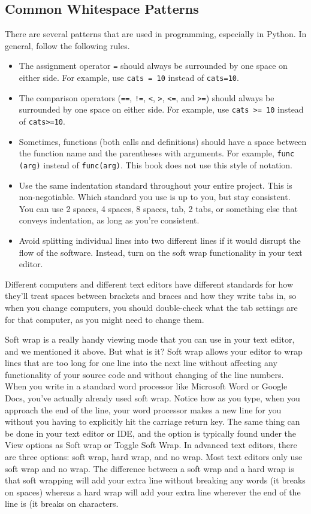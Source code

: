 \subsection{Common Whitespace Patterns}
There are several  patterns that are used in programming, especially in Python. In general, follow the following rules.\par
\begin{itemize}
    \item The assignment operator \verb|=| should always be surrounded by one space on either side. For example, use \verb|cats = 10| instead of \verb|cats=10|.
    \item The comparison operators (\verb|==|, \verb|!=|, \verb|<|, \verb|>|, \verb|<=|, and \verb|>=|) should always be surrounded by one space on either side. For example, use \verb|cats >= 10| instead of \verb|cats>=10|.
    \item Sometimes, functions (both calls and definitions) should have a space between the function name and the parentheses with arguments. For example, \verb|func (arg)| instead of \verb|func(arg)|. This book does not use this style of notation.
    \item Use the same indentation standard throughout your entire project. This is non-negotiable. Which standard you use is up to you, but stay consistent. You can use 2 spaces, 4 spaces, 8 spaces, tab, 2 tabs, or something else that conveys indentation, as long as you're consistent.
    \item Avoid splitting individual lines into two different lines if it would disrupt the flow of the software. Instead, turn on the soft wrap functionality in your text editor.
\end{itemize}
Different computers and different text editors have different standards for how they'll treat spaces between brackets and braces and how they write tabs in, so when you change computers, you should double-check what the tab settings are for that computer, as you might need to change them.\par
Soft wrap is a really handy viewing mode that you can use in your text editor, and we mentioned it above. But what is it? Soft wrap allows your editor to wrap lines that are too long for one line into the next line without affecting any functionality of your source code and without changing of the line numbers. When you write in a standard word processor like Microsoft Word or Google Docs, you've actually already used soft wrap. Notice how as you type, when you approach the end of the line, your word processor makes a new line for you without you having to explicitly hit the carriage return key. The same thing can be done in your text editor or IDE, and the option is typically found under the View options as Soft wrap or Toggle Soft Wrap. In advanced text editors, there are three options: soft wrap, hard wrap, and no wrap. Most text editors only use soft wrap and no wrap. The difference between a soft wrap and a hard wrap is that soft wrapping will add your extra line without breaking any words (it breaks on spaces) whereas a hard wrap will add your extra line wherever the end of the line is (it breaks on characters.\par
